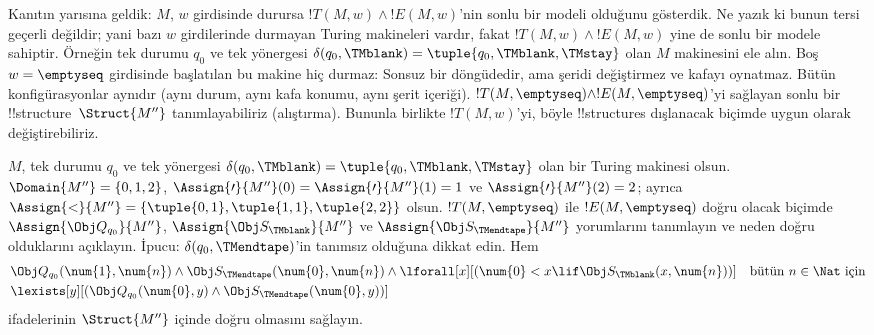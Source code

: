 \documentclass[../../../include/open-logic-section]{subfiles}
\begin{document}
\begin{explain}
  Kanıtın yarısına geldik: $M$, $w$ girdisinde durursa
  $!T(M,w)\land !E(M,w)$'nin sonlu bir modeli olduğunu gösterdik. Ne yazık ki
  bunun tersi geçerli değildir; yani bazı $w$ girdilerinde durmayan Turing
  makineleri vardır, fakat $!T(M,w)\land !E(M,w)$ yine de sonlu bir modele
  sahiptir. Örneğin tek durumu $q_0$ ve tek yönergesi
  $\delta(q_0,\TMblank)=\tuple{q_0,\TMblank,\TMstay}$ olan $M$ makinesini ele
  alın. Boş $w=\emptyseq$ girdisinde başlatılan bu makine hiç durmaz: Sonsuz
  bir döngüdedir, ama şeridi değiştirmez ve kafayı oynatmaz. Bütün
  konfigürasyonlar aynıdır (aynı durum, aynı kafa konumu, aynı şerit içeriği).
  $!T(M,\emptyseq)\land !E(M,\emptyseq)$'yi sağlayan sonlu bir
  !!{structure}~$\Struct{M''}$ tanımlayabiliriz (alıştırma). Bununla birlikte
  $!T(M,w)$'yi, böyle !!{structure}s dışlanacak biçimde uygun olarak
  değiştirebiliriz.

  \begin{prob}
    $M$, tek durumu $q_0$ ve tek yönergesi
    $\delta(q_0,\TMblank)=\tuple{q_0,\TMblank,\TMstay}$ olan bir Turing
    makinesi olsun. $\Domain{M''}=\{0,1,2\}$,
    $\Assign{\prime}{M''}(0)=\Assign{\prime}{M''}(1)=1$ ve
    $\Assign{\prime}{M''}(2)=2$; ayrıca
    $\Assign{<}{M''}=\{\tuple{0,1},\tuple{1,1},\tuple{2,2}\}$ olsun.
    $!T(M,\emptyseq)$ ile $!E(M,\emptyseq)$ doğru olacak biçimde
    $\Assign{\Obj Q_{q_0}}{M''}$, $\Assign{\Obj S_{\TMblank}}{M''}$ ve
    $\Assign{\Obj S_{\TMendtape}}{M''}$ yorumlarını tanımlayın ve neden
    doğru olduklarını açıklayın. İpucu: $\delta(q_0,\TMendtape)$'in tanımsız
    olduğuna dikkat edin. Hem
    \begin{align*}
    & \Obj Q_{q_0}(\num{1}, \num{n}) \land \Obj S_{\TMendtape}(\num{0}, \num{n})
      \land 
      \lforall[x][(\num{0} < x \lif \Obj S_\TMblank(x, \num{n}))] \text{\quad bütün $n \in \Nat$ için}\\
    & \lexists[y][(\Obj Q_{q_0}(\num{0}, y) \land \Obj S_{\TMendtape}(\num{0}, y))]
    \end{align*}
    ifadelerinin $\Struct{M''}$ içinde doğru olmasını sağlayın.
  \end{prob}
\end{explain}
\end{document}
